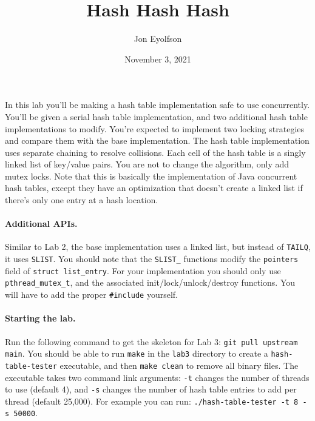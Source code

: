 

\title{Hash Hash Hash}
\author{Jon Eyolfson}
\date{November 3, 2021}



\maketitle

In this lab you'll be making a hash table implementation safe to use
concurrently.
You'll be given a serial hash table implementation, and two additional hash
table implementations to modify.
You're expected to implement two locking strategies and compare them with the
base implementation.
The hash table implementation uses separate chaining to resolve collisions.
Each cell of the hash table is a singly linked list of key/value pairs.
You are not to change the algorithm, only add mutex locks.
Note that this is basically the implementation of Java concurrent hash tables,
except they have an optimization that doesn't create a linked list if there's
only one entry at a hash location.

\paragraph{Additional APIs.}

Similar to Lab 2, the base implementation uses a linked list, but instead of
\texttt{TAILQ}, it uses \texttt{SLIST}.
You should note that the \texttt{SLIST\_} functions modify the \texttt{pointers}
field of \texttt{struct list\_entry}.
For your implementation you should only use \texttt{pthread\_mutex\_t}, and
the associated init/lock/unlock/destroy functions.
You will have to add the proper \texttt{\#include} yourself.

\paragraph{Starting the lab.}

Run the following command to get the skeleton for Lab 3:
\texttt{git pull upstream main}.
You should be able to run \texttt{make} in the \texttt{lab3} directory to
create a \texttt{hash-table-tester} executable, and then \texttt{make clean}
to remove all binary files.
The executable takes two command link arguments: \texttt{-t} changes the number
of threads to use (default 4), and \texttt{-s} changes the number of hash table
entries to add per thread (default 25,000).
For example you can run: \texttt{./hash-table-tester -t 8 -s 50000}.


